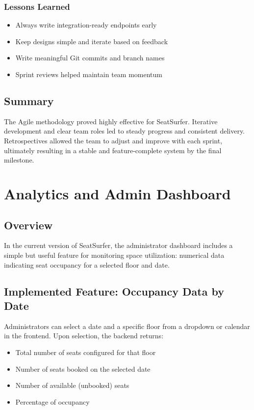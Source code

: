 \documentclass[12pt,a4paper]{report}
\begin{document}
\subsection*{Lessons Learned}

\begin{itemize}
    \item Always write integration-ready endpoints early
    \item Keep designs simple and iterate based on feedback
    \item Write meaningful Git commits and branch names
    \item Sprint reviews helped maintain team momentum
\end{itemize}

\section{Summary}

The Agile methodology proved highly effective for SeatSurfer. Iterative development and clear team roles led to steady progress and consistent delivery. Retrospectives allowed the team to adjust and improve with each sprint, ultimately resulting in a stable and feature-complete system by the final milestone.

\newpage

\chapter{Analytics and Admin Dashboard}

\section{Overview}

In the current version of SeatSurfer, the administrator dashboard includes a simple but useful feature for monitoring space utilization: numerical data indicating seat occupancy for a selected floor and date.

\section{Implemented Feature: Occupancy Data by Date}

Administrators can select a date and a specific floor from a dropdown or calendar in the frontend. Upon selection, the backend returns:
\begin{itemize}
    \item Total number of seats configured for that floor
    \item Number of seats booked on the selected date
    \item Number of available (unbooked) seats
    \item Percentage of occupancy
\end{itemize}
\end{document}
